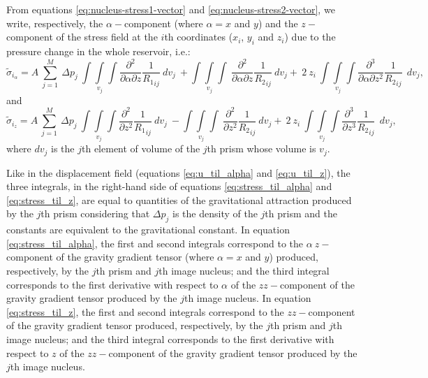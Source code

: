 \documentclass[journal abbreviation, manuscript]{copernicus}
\begin{document}
From equations \ref{eq:nucleus-stress1-vector} and \ref{eq:nucleus-stress2-vector}, we write, respectively,  the $\alpha-$component (where  $\alpha = x$ and $y$) and the $z-$ component of the stress field at the $i$th coordinates ($x_i$, $y_i$  and $z_i$) due to the pressure change in the whole reservoir, i.e.:
\begin{equation}
{\tilde{\sigma}}_{{i}_\alpha} = A \: \sum_{j=1}^{M} 
\: \Delta p_{j}  \: \int\int\limits_{v_j}\int 
\frac{\partial^{2}}{\partial \alpha \partial z} {\frac{1}{{R_1}_{ij}}} \:  dv_j 
\: +   \int\int\limits_{v_j}\int
\: \frac{\partial^{2} }{\partial \alpha \partial z} {\frac{1}{{R_2}_{ij}}}\:  dv_j
+ \: 2 \: z_{i} \:  \int\int\limits_{v_j}\int
\frac{\partial^{3}  }{\partial \alpha \partial z ^{2}} {\frac{1}{{R_2}_{ij}}}  \:\:  dv_j, 
\label{eq:stress_til_alpha}
\end{equation}
and 
\begin{equation}
{\tilde{\sigma}}_{{i}_z} = A \: \sum_{j=1}^{M} 
\: \Delta p_{j}  \: \int\int\limits_{v_j}\int 
\frac{\partial^{2}}{\partial z^{2}} {\frac{1}{{R_1}_{ij}}} \:  dv_j 
\: -   \int\int\limits_{v_j}\int
\: \frac{\partial^{2} }{\partial z^{2}} {\frac{1}{{R_2}_{ij}}}\:  dv_j
+ \: 2 \: z_{i} \:  \int\int\limits_{v_j}\int
\frac{\partial^{3}  }{\partial z ^{3}} {\frac{1}{{R_2}_{ij}}}  \:\:  dv_j, 
\label{eq:stress_til_z}
\end{equation}
where $dv_j$ is the $j$th element of volume of the $j$th prism whose volume is $v_j$.

Like in the displacement field (equations \ref{eq:u_til_alpha} and \ref{eq:u_til_z}), the three integrals, in the right-hand side of equations \ref{eq:stress_til_alpha} and \ref{eq:stress_til_z}, are equal to  quantities of the gravitational attraction produced by the $j$th prism considering that $\Delta p_{j}$ is the density of the $j$th prism and the constants are equivalent to the gravitational constant. 
In equation \ref{eq:stress_til_alpha}, the first and second integrals correspond to the $\alpha \:z-$component of the gravity gradient tensor (where  $\alpha = x$ and $y$) produced, respectively, by the $j$th prism and $j$th image nucleus; and the third integral corresponds to the first derivative with respect to $\alpha$ of the $zz-$component of the gravity gradient tensor produced by the $j$th image nucleus. 
In equation \ref{eq:stress_til_z}, the first and second integrals correspond to the $zz-$component of the gravity gradient tensor produced, respectively, by the $j$th prism and $j$th image nucleus; and the third integral corresponds to the first derivative with respect to $z$ of the $zz-$component of the gravity gradient tensor produced by the $j$th image nucleus. 
\end{document}
